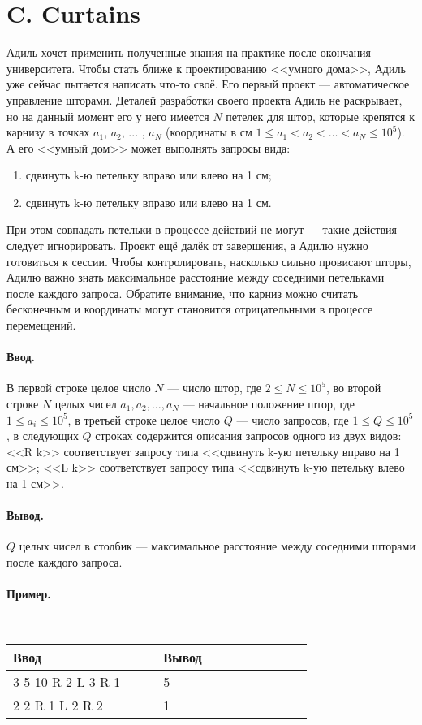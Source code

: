 \documentclass[10pt, a5paper]{article}
\newcommand{\informat}[1]
{
	\paragraph{Ввод.\\} #1
}
\newcommand{\outformat}[1]
{
	\paragraph{Вывод.\\} #1
}
\newcommand{\examplee}[4]
{
	\paragraph{Пример.\\}
	{\tt
	\begin{tabular}{|p{0.4\linewidth}|p{0.4\linewidth}|}
	\hline
	Ввод 	& Вывод  	\\
	\hline
	#1 		& #2 		\\
	\hline
	#3		& #4		\\
	\hline
	\end{tabular}
	}
}
\begin{document}
\section*{C. Curtains}

Адиль хочет применить полученные знания на практике после окончания университета. Чтобы стать ближе к проектированию <<умного дома>>, Адиль уже сейчас пытается написать что-то своё. Его первый проект --- автоматическое управление шторами. Деталей разработки своего проекта Адиль не раскрывает, но на данный момент его у него имеется $N$ петелек для штор, которые крепятся к карнизу в точках $a_1$, $a_2$, ... , $a_N$ (координаты в см \mbox{$1 \le a_1 < a_2 < \dots < a_N \le 10^5$}). А его <<умный дом>> может выполнять запросы вида:
\begin{enumerate}
\item сдвинуть k-ю петельку вправо или влево на 1 см;
\item сдвинуть k-ю петельку вправо или влево на 1 см.
\end{enumerate}
При этом совпадать петельки в процессе действий не могут --- такие действия следует игнорировать. Проект ещё далёк от завершения, а Адилю нужно готовиться к сессии. Чтобы контролировать, насколько сильно провисают шторы, Адилю важно знать максимальное расстояние между соседними петельками после каждого запроса. Обратите внимание, что карниз можно считать бесконечным и координаты могут становится отрицательными в процессе перемещений.

\informat{В первой строке целое число $N$ --- число штор, где $2 \le N \le 10^5$, \newline
во второй строке $N$ целых чисел $a_1, a_2, \dots, a_N$ --- начальное положение штор, где $1 \le a_i \le 10^5$, \newline
в третьей строке целое число $Q$ --- число запросов, где $1 \le Q \le 10^5$, \newline
в следующих $Q$ строках содержится описания запросов одного из двух видов: \newline
<<R k>> соответствует запросу типа <<сдвинуть k-ую петельку вправо на 1 см>>; \newline
<<L k>> соответствует запросу типа <<сдвинуть k-ую петельку влево на 1 см>>.}

\outformat{$Q$ целых чисел в столбик --- максимальное расстояние между соседними шторами после каждого запроса.}

\examplee{
3 \newline
1 5 10 \newline
3 \newline
R 2 \newline
L 3 \newline
R 1
}
{
5 \newline 5 \newline 4
}
{
2 \newline
1 2 \newline 
3 \newline
R 1 \newline
L 2 \newline
R 2 \newline
}{
1 \newline 1 \newline 2
}
\end{document}
